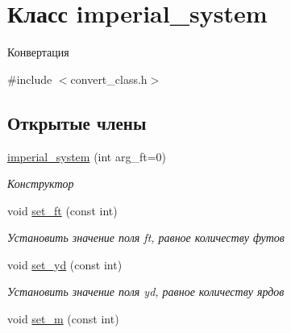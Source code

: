 \hypertarget{classimperial__system}{\section{Класс imperial\+\_\+system}
\label{classimperial__system}
}


Конвертация  




{\ttfamily \#include $<$convert\+\_\+class.\+h$>$}

\subsection*{Открытые члены}
\begin{DoxyCompactItemize}
\item 
\hyperlink{classimperial__system_a6bd0c5dfaf484fddfec9bc159ec0e885}{imperial\+\_\+system} (int arg\+\_\+ft=0)
\begin{DoxyCompactList}\small\item\em Конструктор \end{DoxyCompactList}\item 
\hypertarget{classimperial__system_a544d1ce686bdbc126b5f4c4d0a99246c}{void \hyperlink{classimperial__system_a544d1ce686bdbc126b5f4c4d0a99246c}{set\+\_\+ft} (const int)}\label{classimperial__system_a544d1ce686bdbc126b5f4c4d0a99246c}

\begin{DoxyCompactList}\small\item\em Установить значение поля ft, равное количеству футов \end{DoxyCompactList}\item 
\hypertarget{classimperial__system_a757b446854533b4c7ce79905ed8bb755}{void \hyperlink{classimperial__system_a757b446854533b4c7ce79905ed8bb755}{set\+\_\+yd} (const int)}\label{classimperial__system_a757b446854533b4c7ce79905ed8bb755}

\begin{DoxyCompactList}\small\item\em Установить значение поля yd, равное количеству ярдов \end{DoxyCompactList}\item 
\hypertarget{classimperial__system_afc41fef6eb450802833d9c237df50792}{void \hyperlink{classimperial__system_afc41fef6eb450802833d9c237df50792}{set\+\_\+m} (const int)}\label{classimperial__system_afc41fef6eb450802833d9c237df50792}


\end{DoxyCompactItemize}
